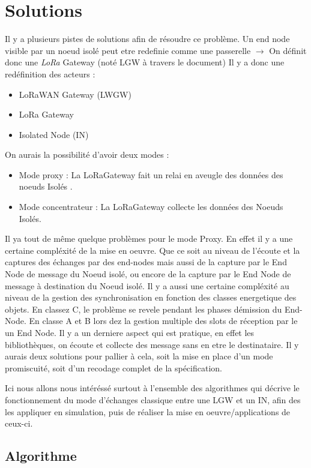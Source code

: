 \chapter{Solutions}
Il y a  plusieurs pistes de solutions afin de résoudre ce problème. Un end node visible par un noeud isolé peut etre redefinie comme une passerelle $\rightarrow$ On définit donc une \textit{LoRa} Gateway (noté LGW à travers le document)
Il y a donc une redéfinition des acteurs :
\begin{itemize}
\item LoRaWAN Gateway (LWGW)
\item LoRa Gateway 
\item Isolated Node (IN)
\end{itemize}

On aurais la possibilité d'avoir deux modes : 
\begin{itemize}
\item Mode proxy : La LoRaGateway fait un relai en aveugle des données des noeuds Isolés .
\item Mode concentrateur : La LoRaGateway collecte les données des Noeuds Isolés.
\end{itemize}
Il ya tout de même quelque problèmes pour le mode Proxy. 
En effet il y a une certaine compléxité de la mise en oeuvre. Que ce soit au niveau de l'écoute et la captures des échanges par des end-nodes mais aussi de la capture par le End Node de message du Noeud isolé, ou encore de la capture par le End Node de message à destination du Noeud isolé. Il y a aussi une certaine compléxité au niveau de la gestion des synchronisation en fonction des classes energetique des objets. En classez C, le problème se revele pendant les phases démission du End-Node. En classe A et B lors dez la gestion multiple des slots de réception par le un End Node. Il y a un derniere aspect qui est pratique, en effet les bibliothèques, on écoute et collecte des message sans en etre le destinataire. Il y aurais deux solutions pour pallier à cela, soit la mise en place d'un mode promiscuité, soit d'un recodage complet de la spécification.


Ici nous allons nous intéréssé surtout à l'ensemble des algorithmes qui décrive le fonctionnement du mode d'échanges classique entre une LGW et un IN, afin des les appliquer en simulation, puis de réaliser la mise en oeuvre/applications de ceux-ci.

\newpage
\section{Algorithme}


